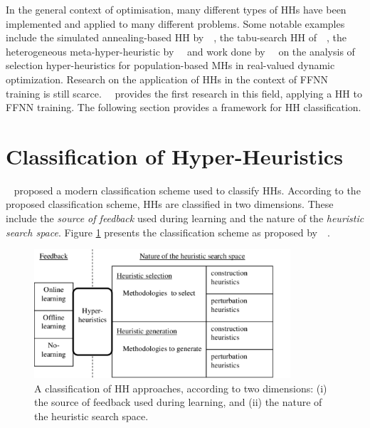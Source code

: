 In the general context of optimisation, many different types of \acp{HH} have been implemented and applied to many different problems. Some notable examples include the simulated annealing-based \acs{HH} by~\citeauthor{ref:dowsland:2007}~\cite{ref:dowsland:2007}, the tabu-search \acs{HH} of~\citeauthor{ref:burke:2010}~\cite{ref:burke:2010}, the heterogeneous meta-hyper-heuristic by~\citeauthor{ref:grobler:2012}~\cite{ref:grobler:2012} and work done by~\citeauthor{ref:vanderstockt:2018}~\cite{ref:vanderstockt:2018} on the analysis of selection hyper-heuristics for population-based \acp{MH} in real-valued dynamic optimization. Research on the application of \acp{HH} in the context of \acs{FFNN} training is still scarce.~\citeauthor{ref:nel:2021}~\cite{ref:nel:2021} provides the first research in this field, applying a \acs{HH} to \acs{FFNN} training. The following section provides a framework for \acs{HH} classification.

\section{Classification of Hyper-Heuristics}\label{sec:hh:classification}

\citeauthor{ref:burke:2010}~\cite{ref:burke:2010} proposed a modern classification scheme used to classify \acp{HH}. According to the proposed classification scheme, \acp{HH} are classified in two dimensions. These include the \textit{source of feedback} used during learning and the nature of the \textit{heuristic search space}. Figure \ref{fig:heuristics:hh:classification} presents the classification scheme as proposed by~\citeauthor{ref:burke:2010}~\cite{ref:burke:2010}.

\begin{figure}[htbp]
      \centering
      \includegraphics[width=0.85\textwidth]{images/hh_classification.pdf}
      \caption{A classification of \acs{HH} approaches, according to two dimensions: (i) the source of feedback used during learning, and (ii) the nature of the heuristic search space.}
      \label{fig:heuristics:hh:classification}
\end{figure}

